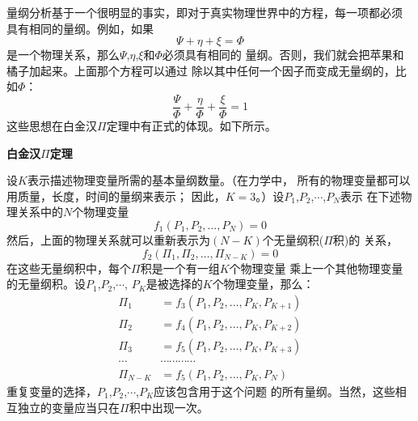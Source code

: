 量纲分析基于一个很明显的事实，即对于真实物理世界中的方程，每一项都必须
具有相同的量纲。例如，如果
\[
  \Psi+\eta+\xi=\Phi
\]
是一个物理关系，那么$\Psi$,$\eta$,$\xi$和$\Phi$必须具有相同的
量纲。否则，我们就会把苹果和橘子加起来。上面那个方程可以通过
除以其中任何一个因子而变成无量纲的，比如$\Phi$：
\[
  \frac{\Psi}{\Phi}+\frac{\eta}{\Phi}+\frac{\xi}{\Phi}=1 
\]
这些思想在白金汉$\Pi$定理中有正式的体现。如下所示。
\begin{notice}
  {\bfseries 白金汉$\Pi$定理}

   设$K$表示描述物理变量所需的基本量纲数量。（在力学中，
   所有的物理变量都可以用质量，长度，时间的量纲来表示；
   因此，$K=3 $。）设$P_1$,$P_2$,$\cdots $,$P_N$表示
   在下述物理关系中的$N$个物理变量
   \[
     f_1(P_1,P_2, \ldots ,P_N)=0
   \]
   然后，上面的物理关系就可以重新表示为$(N-K)$个无量纲积($\Pi$积)的
   关系，
   \[
     f_2(\Pi_1,\Pi_2, \ldots ,\Pi_{N-K})=0
   \]
   在这些无量纲积中，每个$\Pi$积是一个有一组$K$个物理变量
   乘上一个其他物理变量的无量纲积。设$P_1$,$P_2$,$\cdots$,
   $P_K$是被选择的$K$个物理变量，那么：
   \begin{align*}
     \Pi_1&=f_3(P_1,P_2, \ldots ,P_K,P_{K+1})\\ 
     \Pi_2&=f_4(P_1,P_2, \ldots ,P_K,P_{K+2})\\ 
     \Pi_3&=f_5(P_1,P_2, \ldots ,P_K,P_{K+3})\\ 
     \cdots &\cdots \cdots \cdots \cdots \\ 
     \Pi_{N-K}&=f_5(P_1,P_2, \ldots ,P_K,P_N)
   \end{align*}
   重复变量的选择，$P_1$,$P_2$,$\cdots $,$P_K$应该包含用于这个问题
   的所有量纲。当然，这些相互独立的变量应当只在$\Pi$积中出现一次。
\end{notice}

